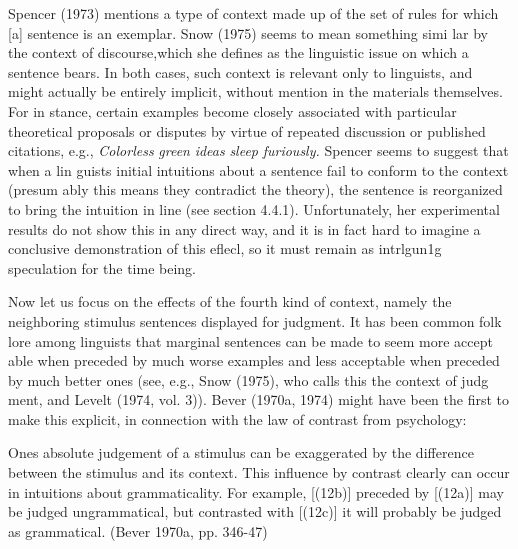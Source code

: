 \begin{styleStandard}
Spencer (1973) mentions a type of context made up of {\textquotedbl}the set of rules for which [a] sentence is an exemplar.{\textquotedbl} Snow (1975) seems to mean something simi\- lar by the {\textquotedbl}context of discourse,{\textquotedbl}which she defines as the linguistic issue on which a sentence bears. In both cases, such context is relevant only to linguists, and might actually be entirely implicit, without mention in the materials themselves. For in\- stance, certain examples become closely associated with particular theoretical proposals or disputes by virtue of repeated discussion or published citations, e.g., \textit{Colorless}\textit{ }\textit{green}\textit{ }\textit{ideas}\textit{ }\textit{sleep}\textit{ }\textit{furiously.}\textit{ }Spencer seems to suggest that when a lin\- guist{\textquotesingle}s initial intuitions about a sentence fail to conform to the context (presum\- ably this means they contradict the theory), the sentence is reorganized to bring the intuition in line (see section 4.4.1). Unfortunately, her experimental results do not show this in any direct way, and it is in fact hard to imagine a conclusive demonstration of this eflecl, so it must remain as intrlgun1g speculation for the time being.
\end{styleStandard}


\begin{styleStandard}
Now let us focus on the effects of the fourth kind of context, namely the neighboring stimulus sentences displayed for judgment. It has been common folk\- lore among linguists that marginal sentences can be made to seem more accept\- able when preceded by much worse examples and less acceptable when preceded by much better ones (see, e.g., Snow (1975), who calls this the context of judg\- ment, and Levelt (1974, vol. 3)). Bever (1970a, 1974) might have been the first to make this explicit, in connection with the law of contrast from psychology:
\end{styleStandard}


\clearpage\setcounter{page}{1}\begin{styleStandard}
One{\textquotesingle}s {\textquotedbl}absolute{\textquotedbl} judgement of a stimulus can be exaggerated by the difference between the stimulus and its context. This influence by contrast clearly can occur in {\textquotedbl}intuitions{\textquotedbl} about grammaticality. For example, [(12b)] preceded by [(12a)] may be judged ungrammatical, but contrasted with [(12c)] it will probably be judged as grammatical. (Bever 1970a, pp. 346-47)
\end{styleStandard}


